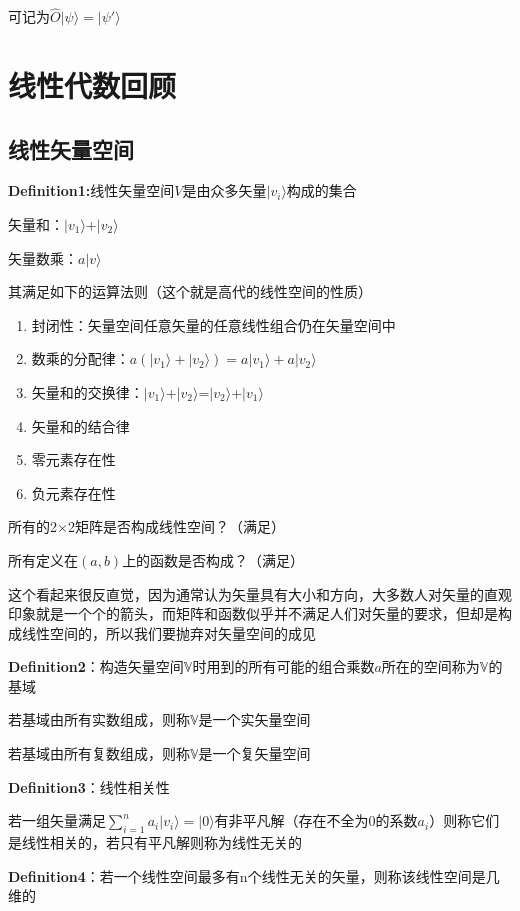\documentclass[lang=cn,10pt]{elegantbook}
\begin{document}
	
可记为$\hat{O}|\psi \rangle =|\psi' \rangle $

\section{线性代数回顾}
\subsection{线性矢量空间}

\textbf{Definition1:}线性矢量空间$V$是由众多矢量$|v_i \rangle $构成的集合

矢量和：$|v_1 \rangle $+$|v_2 \rangle $

矢量数乘：$a|v \rangle $

其满足如下的运算法则（这个就是高代的线性空间的性质）
\begin{enumerate}
	\item 封闭性：矢量空间任意矢量的任意线性组合仍在矢量空间中
	\item 数乘的分配律：$a(|v_1 \rangle +|v_2 \rangle)=a|v_1 \rangle +a|v_2 \rangle$
	\item 矢量和的交换律：$|v_1 \rangle $+$|v_2 \rangle $=$|v_2 \rangle $+$|v_1 \rangle $
	\item 矢量和的结合律
	\item 零元素存在性
	\item 负元素存在性
\end{enumerate}

所有的2$\times$2矩阵是否构成线性空间？（满足）

所有定义在$(a,b) $上的函数是否构成？（满足）

这个看起来很反直觉，因为通常认为矢量具有大小和方向，大多数人对矢量的直观印象就是一个个的箭头，而矩阵和函数似乎并不满足人们对矢量的要求，但却是构成线性空间的，所以我们要抛弃对矢量空间的成见

\textbf{Definition2}：构造矢量空间$\mathbb{V}$时用到的所有可能的组合乘数$a$所在的空间称为$\mathbb{V}$的基域

若基域由所有实数组成，则称$\mathbb{V}$是一个实矢量空间

若基域由所有复数组成，则称$\mathbb{V}$是一个复矢量空间

\textbf{Definition3}：线性相关性

若一组矢量满足$\sum_{i=1}^n{a_i|v_i\rangle =|0\rangle}$有非平凡解（存在不全为0的系数$a_i$）则称它们是线性相关的，若只有平凡解则称为线性无关的

\textbf{Definition4}：若一个线性空间最多有n个线性无关的矢量，则称该线性空间是几维的
\end{document}
